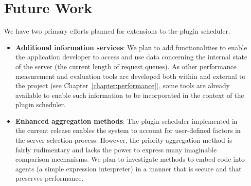 %
%


\section{Future Work}

We have two primary efforts planned for extensions to the plugin scheduler.
\begin{itemize}
\item \textbf{Additional information services}: We plan to add functionalities
  to enable the application developer to access and use data concerning the
  internal state of the \diet server (\eg the current length of request
  queues).  As other performance measurement and evaluation tools are developed
  both within and external to the \diet project (see
  Chapter~\ref{chapter:performance}), some tools are already available to
  enable such  information to be incorporated in the context of the plugin
  scheduler.
\item \textbf{Enhanced aggregation methods}: The plugin scheduler implemented
  in the current release enables the \diet system to account for user-defined
  factors in the server selection process.  However, the priority aggregation
  method is fairly rudimentary and lacks the power to express many imaginable
  comparison mechanisms.  We plan to investigate methods to embed code into
  \diet agents (\eg a simple expression interpreter) in a manner that is secure
  and that preserves performance.
\end{itemize}


